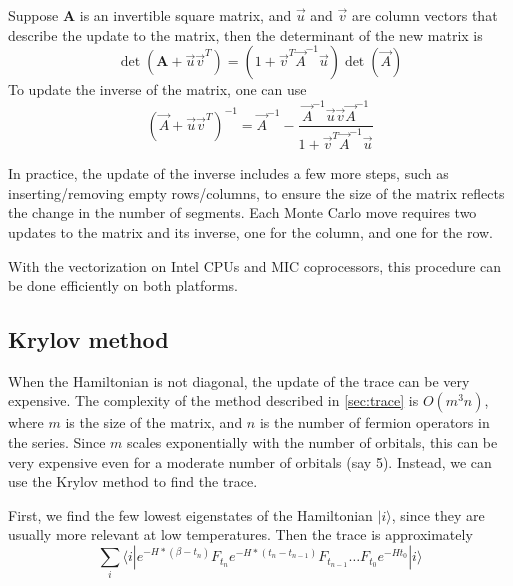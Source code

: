 Suppose $\mathbf A$ is an invertible square matrix, and $\vec{u}$ and $\vec{v}$
are column vectors that describe the update to the matrix, then the determinant
of the new matrix is
\begin{equation}
\det({\mathbf A}+\vec{u}\vec{v}^T)=(1+\vec{v}^T\vec{A}^{-1}\vec{u})\det(\vec{A})
\end{equation}
To update the inverse of the matrix, one can use
\begin{equation}
(\vec{A}+\vec{u}\vec{v}^T)^{-1}=\vec{A}^{-1}-
\frac{\vec{A}^{-1}\vec{u}\vec{v}\vec{A}^{-1}}{1+\vec{v}^T\vec{A}^{-1}\vec{u}}
\end{equation}

In practice, the update of the inverse includes a few more steps, such as 
inserting/removing empty rows/columns, to ensure the size of the matrix 
reflects the change in the number of segments. Each Monte Carlo move requires two
updates to the matrix and its inverse, one for the column, and one for the row.

With the vectorization on Intel CPUs and MIC coprocessors, this procedure can 
be done efficiently on both platforms.



\subsection{Krylov method}
\label{sec:cthyb_krylov}
When the Hamiltonian is not diagonal, the update of the trace can be very expensive.
 The complexity of the method described in \ref{sec:trace}
 is $O(m^3n)$, where $m$ is the size of the 
matrix, and $n$ is the number of fermion operators in the series. Since $m$ 
scales exponentially with the number of orbitals, this can be 
very expensive even for a moderate number of orbitals (say 5). Instead, we can 
use the Krylov method to find the trace.

First, we find the few lowest eigenstates of the Hamiltonian $|i\rangle$, since 
they are usually more relevant at low temperatures. Then the trace is 
approximately
\[
\sum_i\langle i|  e^{-H*(\beta-t_n)}F_{t_n}e^{-H*(t_n-t_{n-1})}F_{t_{n-1}}
\ldots F_{t_0}e^{-Ht_0}  |i\rangle
\]


